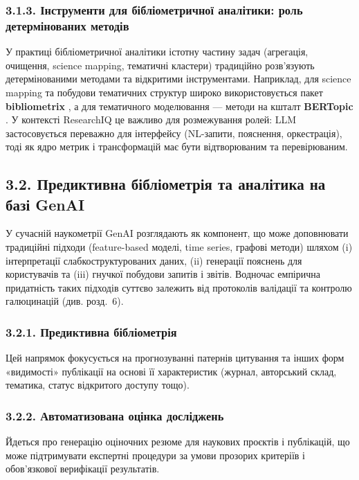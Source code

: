 \subsubsection*{3.1.3. Інструменти для бібліометричної аналітики: роль детермінованих методів}

У практиці бібліометричної аналітики істотну частину задач (агрегація, очищення, science mapping, тематичні кластери) традиційно розв'язують детермінованими методами та відкритими інструментами. Наприклад, для science mapping та побудови тематичних структур широко використовується пакет \textbf{bibliometrix} \cite{Aria2017bibliometrix}, а для тематичного моделювання --- методи на кшталт \textbf{BERTopic} \cite{Grootendorst2022BERTopic}. У контексті ResearchIQ це важливо для розмежування ролей: LLM застосовується переважно для інтерфейсу (NL-запити, пояснення, оркестрація), тоді як ядро метрик і трансформацій має бути відтворюваним та перевірюваним.

\subsection*{3.2. Предиктивна бібліометрія та аналітика на базі GenAI}

У сучасній наукометрії GenAI розглядають як компонент, що може доповнювати традиційні підходи (feature-based моделі, time series, графові методи) шляхом (i) інтерпретації слабкоструктурованих даних, (ii) генерації пояснень для користувачів та (iii) гнучкої побудови запитів і звітів. Водночас емпірична придатність таких підходів суттєво залежить від протоколів валідації та контролю галюцинацій (див. розд.~6).

\subsubsection*{3.2.1. Предиктивна бібліометрія}

Цей напрямок фокусується на прогнозуванні патернів цитування та інших форм «видимості» публікації на основі її характеристик (журнал, авторський склад, тематика, статус відкритого доступу тощо).

\subsubsection*{3.2.2. Автоматизована оцінка досліджень}

Йдеться про генерацію оціночних резюме для наукових проєктів і публікацій, що може підтримувати експертні процедури за умови прозорих критеріїв і обов'язкової верифікації результатів.

